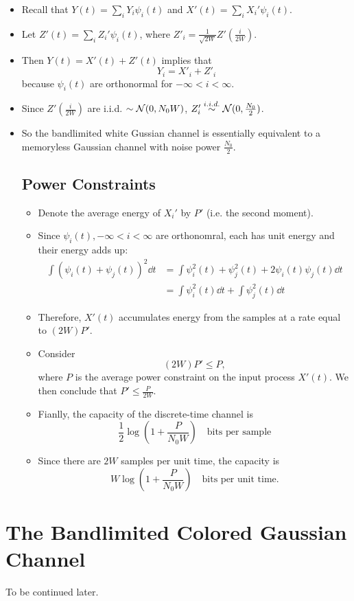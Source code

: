 \documentclass[../main.tex]{subfiles}
\begin{document}
\begin{itemize}
    \item Recall that $Y(t)=\sum_iY_i\psi_i(t)$ and $X'(t)=\sum_iX_i'\psi_i(t)$.
    \item Let $Z'(t)=\sum_i Z_i'\psi_i(t)$, where $Z'_i=\frac{1}{\sqrt{2W}}Z'(\frac{i}{2W})$.
    \item Then $Y(t)=X'(t)+Z'(t)$ implies that  \[
    Y_i = X'_i+Z'_i
    \] because $\psi_i(t)$ are orthonormal for $-\infty <i<\infty$.
    \item Since $Z'(\frac{i}{2W})$ are i.i.d. $\sim \mathcal{N}(0,N_0W)$, $Z_i'\overset{i.i.d.}{\sim}\mathcal{N}(0,\frac{N_0}{2})$.
    \item So the bandlimited white Gussian channel is essentially equivalent to a memoryless Gaussian channel with noise power $\frac{N_0}{2}$.
    \subsection{Power Constraints}
    \begin{itemize}
        \item Denote the average energy of $X_i'$ by $P'$ (i.e. the second moment).
        \item Since $\psi_i(t), -\infty < i <\infty$ are orthonomral, each has unit energy and their energy adds up: \begin{align*}
            \int (\psi_i(t)+\psi_j(t))^2\dd t &=\int \psi^2_i(t)+\psi^2_j(t)+2\psi_i(t)\psi_j(t) \dd t\\
            &=\int \psi^2_i(t) \dd t +\int \psi_j^2(t)\dd t
        \end{align*}
        \item Therefore, $X'(t)$ accumulates energy from the samples at a rate equal to $(2W)P'$.
        \item Consider \[
        (2W)P' \leq P,
        \] where $P$ is the average power constraint on the input process $X'(t)$. We then conclude that $P'\leq \frac{P}{2W}$.
        \item Fianlly, the capacity of the discrete-time channel is \[
        \frac{1}{2}\log(1+\frac{P}{N_0W})\quad \text{bits per sample}
        \]
        \item Since there are $2W$ samples per unit time, the capacity is \[
        W\log(1+\frac{P}{N_0W})\quad\text{bits per unit time.}
        \]
    \end{itemize}
\end{itemize}
\section{The Bandlimited Colored Gaussian Channel}
To be continued later.
\end{document}
